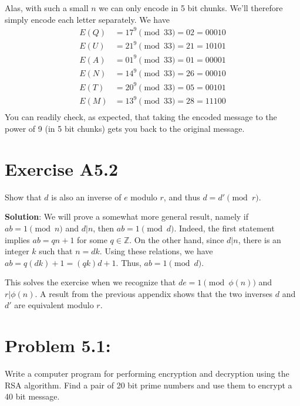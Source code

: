 \documentclass{book}
\begin{document}
    Alas, with such a small $n$ we can only encode in 5 bit chunks. We'll therefore simply encode each letter separately. We have
    \begin{align}
        E(Q) &= 17^9 \pmod{33} = 02 = 00010 \\
        E(U) &= 21^9 \pmod{33} = 21 = 10101 \\
        E(A) &= 01^9 \pmod{33} = 01 = 00001 \\
        E(N) &= 14^9 \pmod{33} = 26 = 00010 \\
        E(T) &= 20^9 \pmod{33} = 05 = 00101 \\
        E(M) &= 13^9 \pmod{33} = 28 = 11100 \\
    \end{align}
    You can readily check, as expected, that taking the encoded message to the power of 9 (in 5 bit chunks) gets you back to the original message.

\section*{Exercise A5.2} 
    Show that $d$ is also an inverse of $e$ modulo $r$, and thus $d=d'\pmod{r}$.
    
    \textbf{Solution}: We will prove a somewhat more general result, namely if $ab = 1\pmod{n}$ and $d|n$, then $ab=1\pmod{d}$. Indeed, the first statement implies $ab = qn + 1$ for some $q\in \mathbb{Z}$. On the other hand, since $d|n$, there is an integer $k$ such that $n = dk$. Using these relations, we have $ab = q(dk)+1 = (qk)d + 1$. Thus, $ab=1\pmod{d}$.
    
    This solves the exercise when we recognize that $de=1\pmod{\phi(n)}$ and $r|\phi(n)$. A result from the previous appendix shows that the two inverses $d$ and $d'$ are equivalent modulo $r$.

\section*{Problem 5.1:} 
    Write a computer program for performing encryption and decryption using the RSA algorithm. Find a pair of 20 bit prime numbers and use them to encrypt a 40 bit message.
    
\end{document}

